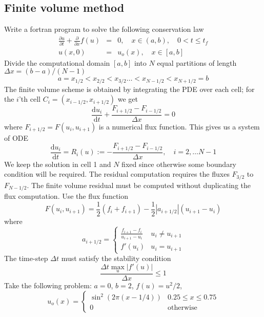 \documentclass[11pt,oneside]{amsart}
\newcommand{\ud}{\textrm{d}}
\newcommand{\dd}[2]{\frac{\ud #1}{\ud #2}}
\newcommand{\df}[2]{\frac{\partial #1}{\partial #2}}
\begin{document}
\subsection{Finite volume method}
Write a fortran program to solve the following conservation law
\begin{eqnarray*}
\df{u}{t} + \df{}{x}f(u) &=& 0, \quad x \in (a,b), \quad 0 < t \le t_f \\
u(x,0) &=& u_o(x), \quad x \in [a,b]
\end{eqnarray*}
Divide the computational domain $[a,b]$ into $N$ equal partitions of length $\Delta x = (b-a)/(N-1)$
\begin{equation*}
a=x_{1/2} < x_{2/2} < x_{3/2} \ldots < x_{N-1/2} < x_{N+1/2} = b
\end{equation*}
The finite volume scheme is obtained by integrating the PDE over each cell; for the $i$'th cell $C_i = (x_{i-1/2}, x_{i+1/2})$ we get
\begin{equation*}
\dd{u_i}{t} + \frac{F_{i+1/2} - F_{i-1/2}}{\Delta x} = 0
\end{equation*}
where $F_{i+1/2} = F(u_i,u_{i+1})$ is a numerical flux function. This gives us a system of ODE
\begin{equation*}
\dd{u_i}{t} = R_i(u) := - \frac{F_{i+1/2} - F_{i-1/2}}{\Delta x}, \quad i=2,\ldots N-1
\end{equation*}
We keep the solution in cell 1 and $N$ fixed since otherwise some boundary condition will be required. The residual computation requires the fluxes  $F_{3/2}$ to $F_{N-1/2}$.  The finite volume residual must be computed without duplicating the flux computation. Use the flux function
\begin{equation*}
F(u_i, u_{i+1}) = \frac{1}{2}(f_i + f_{i+1}) - \frac{1}{2} | a_{i+1/2} | (u_{i+1} - u_i)
\end{equation*}
where
\begin{equation*}
a_{i+1/2} = \left\{ \begin{array}{cc}
\frac{ f_{i+1} - f_i }{u_{i+1} - u_i} & u_i \ne u_{i+1} \\
f'(u_i) & u_i = u_{i+1}
\end{array} \right.
\end{equation*}
The time-step $\Delta t$ must satisfy the stability condition
\begin{equation*}
\frac{\Delta t \max_u | f'(u) |}{\Delta x} \le 1
\end{equation*}
Take the following problem: $a=0$, $b=2$, $f(u) = u^2/2$,
\begin{equation*}
u_o(x) = \left\{ \begin{array}{cc}
\sin^2(2\pi (x-1/4)) & 0.25 \le x \le 0.75 \\
0                  & \textrm{otherwise}
\end{array} \right.
\end{equation*}
\end{document}
